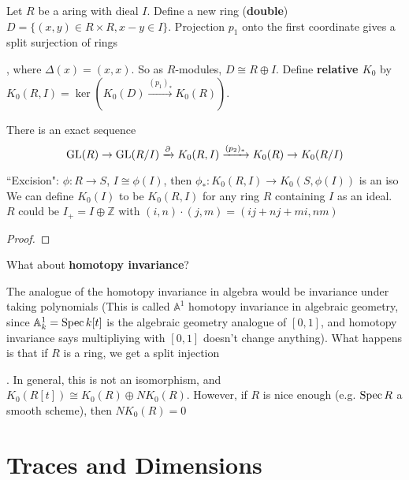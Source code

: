\documentclass[main]{subfiles}
\begin{document}
Let $R$ be a aring with dieal $I$. Define a new ring (\textbf{double}) $D=\{(x,y)\in R\times R,x-y\in I\}$. Projection $p_1$ onto the first coordinate gives a split surjection of rings , where $\Delta(x)=(x,x)$. So as $R$-modules, $D\cong R\oplus I$. Define \textbf{relative $K_0$} by $K_0(R,I)=\ker(K_0(D)\xrightarrow{(p_1)_*} K_0(R))$.


\begin{theorem}
There is an exact sequence
\[\operatorname{GL}(R)\to\operatorname{GL}(R/I)\xrightarrow{\partial} K_0(R,I)\xrightarrow{(p_2)_*} K_0(R)\to K_0(R/I)\]
\end{theorem}

``Excision": $\phi:R\to S$, $I\cong \phi(I)$, then $\phi_*:K_0(R,I)\to K_0(S,\phi(I))$ is an iso
We can define $K_0(I)$ to be $K_0(R,I)$ for any ring $R$ containing $I$ as an ideal. $R$ could be $I_+=I\oplus \mathbb Z$ with $(i,n)\cdot(j,m)=(ij+nj+mi,nm)$

\begin{proof}

\end{proof}

What about \textbf{homotopy invariance}?

The analogue of the homotopy invariance in algebra would be invariance under taking polynomials (This is called $\mathbb A^1$ homotopy invariance in algebraic geometry, since $\mathbb A^1_k=\operatorname{Spec} k[t]$ is the algebraic geometry analogue of $[0,1]$, and homotopy invariance says multipliying with $[0,1]$ doesn't change anything). What happens is that if $R$ is a ring, we get a split injection . In general, this is not an isomorphism, and $K_0(R[t])\cong K_0(R)\oplus NK_0(R)$. However, if $R$ is nice enough (e.g. $\operatorname{Spec} R$ a smooth scheme), then $NK_0(R)=0$

\section{Traces and Dimensions}
\end{document}
